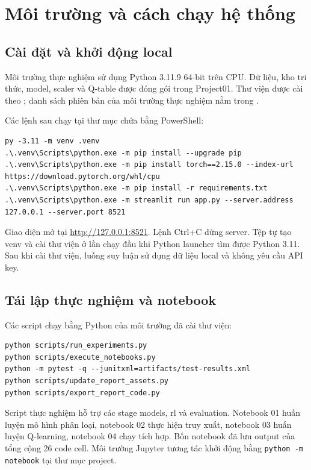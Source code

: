 \chapter{Môi trường và cách chạy hệ thống}
\section{Cài đặt và khởi động local}
Môi trường thực nghiệm sử dụng Python 3.11.9 64-bit trên CPU. Dữ liệu, kho tri thức, model, scaler và Q-table được đóng gói trong Project01. Thư viện được cài theo ; danh sách phiên bản của môi trường thực nghiệm nằm trong .

Các lệnh sau chạy tại thư mục chứa  bằng PowerShell:
\begin{lstlisting}[language={},caption={Cài thư viện và khởi động giao diện local.}]
py -3.11 -m venv .venv
.\.venv\Scripts\python.exe -m pip install --upgrade pip
.\.venv\Scripts\python.exe -m pip install torch==2.15.0 --index-url https://download.pytorch.org/whl/cpu
.\.venv\Scripts\python.exe -m pip install -r requirements.txt
.\.venv\Scripts\python.exe -m streamlit run app.py --server.address 127.0.0.1 --server.port 8521
\end{lstlisting}

Giao diện mở tại \url{http://127.0.0.1:8521}. Lệnh Ctrl+C dừng server. Tệp  tự tạo venv và cài thư viện ở lần chạy đầu khi Python launcher tìm được Python 3.11. Sau khi cài thư viện, luồng suy luận sử dụng dữ liệu local và không yêu cầu API key.

\section{Tái lập thực nghiệm và notebook}
Các script chạy bằng Python của môi trường đã cài thư viện:
\begin{lstlisting}[language={},caption={Tái lập artifact, notebook và kiểm thử.}]
python scripts/run_experiments.py
python scripts/execute_notebooks.py
python -m pytest -q --junitxml=artifacts/test-results.xml
python scripts/update_report_assets.py
python scripts/export_report_code.py
\end{lstlisting}

Script thực nghiệm hỗ trợ các stage models, rl và evaluation. Notebook 01 huấn luyện mô hình phân loại, notebook 02 thực hiện truy xuất, notebook 03 huấn luyện Q-learning, notebook 04 chạy tích hợp. Bốn notebook đã lưu output của tổng cộng 26 code cell. Môi trường Jupyter tương tác khởi động bằng \texttt{python -m notebook} tại thư mục project.

